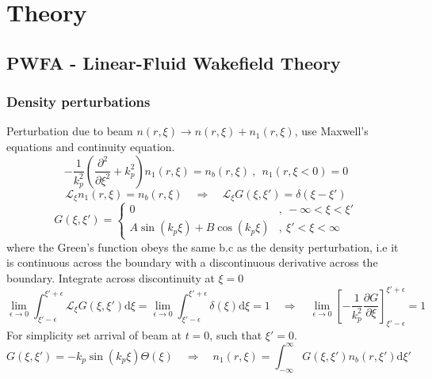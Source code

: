 \chapter{Theory}


\section{PWFA - Linear-Fluid Wakefield Theory}
\subsection{Density perturbations}
Perturbation due to beam $n\left(r,\xi \right)\to n\left(r,\xi \right)+n_1\left(r,\xi \right)$, use Maxwell's equations and continuity equation.
\begin{equation}
-\frac{1}{k_p^2}\left(\frac{\partial^2 }{\partial \xi^2}+k_p^2\right)n_1\left(r,\xi \right)=n_b\left(r,\xi \right) ~,~~n_1\left(r,\xi<0 \right)=0
\end{equation}
\begin{equation}
\mathcal{L}_{\xi}n_1\left(r,\xi \right)=n_b\left(r,\xi \right) \quad \Rightarrow \quad \mathcal{L}_{\xi}G\left(\xi,\xi'\right)=\delta\left(\xi-\xi'\right)
\end{equation}
\begin{equation}
G\left(\xi,\xi'\right)=\left\{ \begin{array}{ll}
0 &,~ -\infty<\xi<\xi'\\
A\sin\left(k_p\xi \right) + B\cos\left(k_p\xi \right) &,~ \xi'<\xi<\infty
\end{array}\right.
\end{equation}
where the Green's function obeys the same b.c as the density perturbation, i.e it is continuous across the boundary with a discontinuous derivative across the boundary.
Integrate across discontinuity at $\xi=0$
\begin{equation}
\lim_{\epsilon\to 0}\int_{\xi'-\epsilon}^{\xi'+\epsilon} \mathcal{L}_{\xi}G\left(\xi,\xi'\right)\mathrm{d}\xi=\lim_{\epsilon\to 0}\int_{\xi'-\epsilon}^{\xi'+\epsilon}\delta\left(\xi\right)\mathrm{d}\xi=1 \quad \Rightarrow \quad \lim_{\epsilon\to 0}\left[-\frac{1}{k_p^2}\frac{\partial G}{\partial \xi}\right]^{\xi'+\epsilon}_{\xi'-\epsilon}=1
\end{equation}
For simplicity set arrival of beam at $t=0$, such that $\xi'=0$.
\begin{equation}
G\left(\xi,\xi'\right)=-k_p\sin\left(k_p\xi \right)\Theta\left(\xi \right) \quad \Rightarrow \quad n_1\left(r,\xi \right)=\int_{-\infty}^{\infty}G\left(\xi,\xi'\right)n_b\left(r,\xi' \right) \mathrm{d}\xi'
\end{equation}
